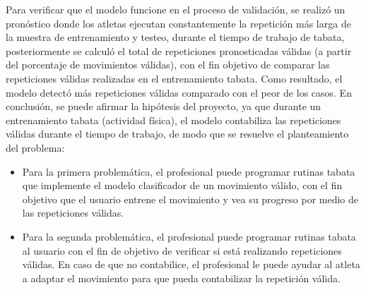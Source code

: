 \medbreak
Para verificar que el modelo funcione en el proceso de validaci\'on, se realiz\'o un pron\'ostico donde los atletas ejecutan constantemente la repetici\'on m\'as larga de la muestra de entrenamiento y testeo, durante el tiempo de trabajo de tabata, posteriormente se calcul\'o el total de repeticiones pronosticadas v\'alidas (a partir del porcentaje de movimientos v\'alidas), con el fin objetivo de comparar las repeticiones v\'alidas realizadas en el entrenamiento tabata. Como resultado, el modelo detect\'o m\'as repeticiones v\'alidas comparado con el peor de los casos.
\medbreak
En conclusi\'on, se puede afirmar la hip\'otesis del proyecto, ya que durante un entrenamiento tabata (actividad f\'isica), el modelo contabiliza las repeticiones v\'alidas durante el tiempo de trabajo, de modo que se resuelve el planteamiento del problema:
\begin{itemize}
\item	Para la primera problem\'atica, el profesional puede programar rutinas tabata que implemente el modelo clasificador de un movimiento v\'alido, con el fin objetivo que el usuario entrene el movimiento y vea su progreso por medio de las repeticiones v\'alidas.
\item	Para la segunda problem\'atica, el profesional puede programar rutinas tabata al usuario con el fin de objetivo de verificar si est\'a realizando repeticiones v\'alidas. En caso de que no contabilice, el profesional le puede ayudar al atleta a adaptar el movimiento para que pueda contabilizar la repetici\'on v\'alida.
\end{itemize}
